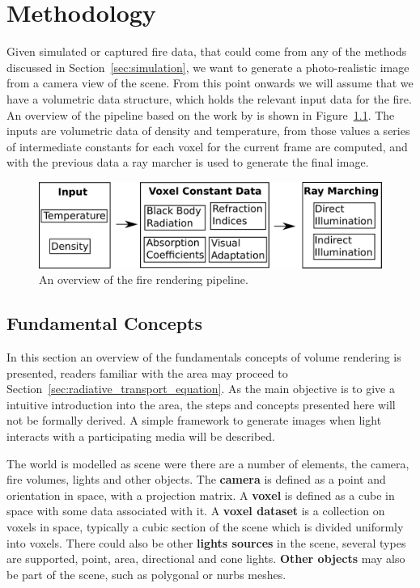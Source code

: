 \chapter{Methodology}
\label{ch:methodology}

Given simulated or captured fire data, that could come from any of the methods discussed in Section~\ref{sec:simulation}, we want to generate a photo-realistic image from a camera view of the scene.
From this point onwards we will assume that we have a volumetric data structure, which holds the relevant input data for the fire.
An overview of the pipeline based on the work by \cite{Pegoraro:2006} is shown in Figure~\ref{fig:pipeline}.
The inputs are volumetric data of density and temperature, from those values a series of intermediate constants for each voxel for the current frame are computed, and with the previous data a ray marcher is used to generate the final image.

\begin{figure}[htbp!]
	\centering
	\includegraphics[width=\textwidth]{img/pipeline}
	\caption{An overview of the fire rendering pipeline.}
	\label{fig:pipeline}
\end{figure}

\section{Fundamental Concepts}
\label{sec:fundamental_concepts}

In this section an overview of the fundamentals concepts of volume rendering is presented, readers familiar with the area may proceed to Section~\ref{sec:radiative_transport_equation}.
As the main objective is to give a intuitive introduction into the area, the steps and concepts presented here will not be formally derived.
A simple framework to generate images when light interacts with a participating media will be described. 

The world is modelled as scene were there are a number of elements, the camera, fire volumes, lights and other objects.
The \textbf{camera} is defined as a point and orientation in space, with a projection matrix.
A \textbf{voxel} is defined as a cube in space with some data associated with it.
A \textbf{voxel dataset} is a collection on voxels in space, typically a cubic section of the scene which is divided uniformly into voxels.
There could also be other \textbf{lights sources} in the scene, several types are supported, point, area, directional and cone lights.
\textbf{Other objects} may also be part of the scene, such as polygonal or nurbs meshes.

